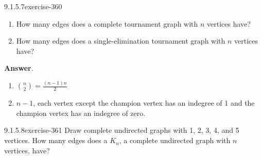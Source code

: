 \documentclass[twoside,10pt,]{book}
\numberwithin{equation}{section}
\begin{document}
\begin{divisionsolution}{9.1.5.7}{}{exercise-360}%
\hypertarget{p-3080}{}%
\leavevmode%
\begin{enumerate}[label=(\alph*)]
\item\hypertarget{li-1491}{}\hypertarget{p-3081}{}%
How many edges does a complete tournament graph with \(n\) vertices have?%
\item\hypertarget{li-1492}{}\hypertarget{p-3082}{}%
How many edges does a single-elimination tournament graph with \(n\) vertices have?%
\end{enumerate}
%
\par\smallskip%
\noindent\textbf{Answer}.\quad%
\hypertarget{p-3083}{}%
\leavevmode%
\begin{enumerate}[label=(\alph*)]
\item\hypertarget{li-1493}{}\hypertarget{p-3084}{}%
\(\binom{n}{2}=\frac{(n-1)n}{2}\)%
\item\hypertarget{li-1494}{}\hypertarget{p-3085}{}%
\(n-1\), each vertex except the champion vertex has an indegree of 1 and the champion vertex has an indegree of zero.%
\end{enumerate}
%
\end{divisionsolution}%
\begin{divisionsolution}{9.1.5.8}{}{exercise-361}%
\hypertarget{p-3086}{}%
Draw complete undirected graphs with 1, 2, 3, 4, and 5 vertices. How many edges does a \(K_n\), a complete undirected graph with \(n\) vertices, have?%
\end{divisionsolution}%
\end{document}
